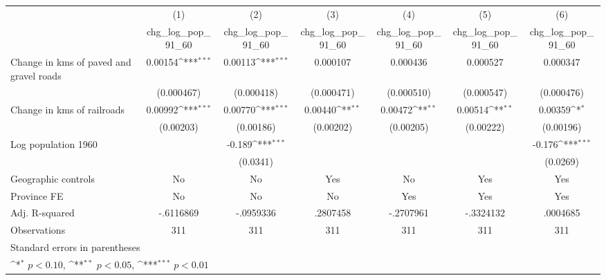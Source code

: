 {
\def\sym#1{\ifmmode^{#1}\else\(^{#1}\)\fi}
\begin{tabular}{l*{6}{c}}
\hline\hline
                    &\multicolumn{1}{c}{(1)}&\multicolumn{1}{c}{(2)}&\multicolumn{1}{c}{(3)}&\multicolumn{1}{c}{(4)}&\multicolumn{1}{c}{(5)}&\multicolumn{1}{c}{(6)}\\
                    &\multicolumn{1}{c}{chg\_log\_pop\_91\_60}&\multicolumn{1}{c}{chg\_log\_pop\_91\_60}&\multicolumn{1}{c}{chg\_log\_pop\_91\_60}&\multicolumn{1}{c}{chg\_log\_pop\_91\_60}&\multicolumn{1}{c}{chg\_log\_pop\_91\_60}&\multicolumn{1}{c}{chg\_log\_pop\_91\_60}\\
\hline
Change in kms of paved and gravel roads&     0.00154\sym{***}&     0.00113\sym{***}&    0.000107         &    0.000436         &    0.000527         &    0.000347         \\
                    &  (0.000467)         &  (0.000418)         &  (0.000471)         &  (0.000510)         &  (0.000547)         &  (0.000476)         \\
[1em]
Change in kms of railroads&     0.00992\sym{***}&     0.00770\sym{***}&     0.00440\sym{**} &     0.00472\sym{**} &     0.00514\sym{**} &     0.00359\sym{*}  \\
                    &   (0.00203)         &   (0.00186)         &   (0.00202)         &   (0.00205)         &   (0.00222)         &   (0.00196)         \\
[1em]
Log population 1960 &                     &      -0.189\sym{***}&                     &                     &                     &      -0.176\sym{***}\\
                    &                     &    (0.0341)         &                     &                     &                     &    (0.0269)         \\
\hline
Geographic controls &          No         &          No         &         Yes         &          No         &         Yes         &         Yes         \\
Province FE         &          No         &          No         &          No         &         Yes         &         Yes         &         Yes         \\
Adj. R-squared      &   -.6116869         &   -.0959336         &    .2807458         &   -.2707961         &   -.3324132         &    .0004685         \\
Observations        &         311         &         311         &         311         &         311         &         311         &         311         \\
\hline\hline
\multicolumn{7}{l}{\footnotesize Standard errors in parentheses}\\
\multicolumn{7}{l}{\footnotesize \sym{*} \(p<0.10\), \sym{**} \(p<0.05\), \sym{***} \(p<0.01\)}\\
\end{tabular}
}
